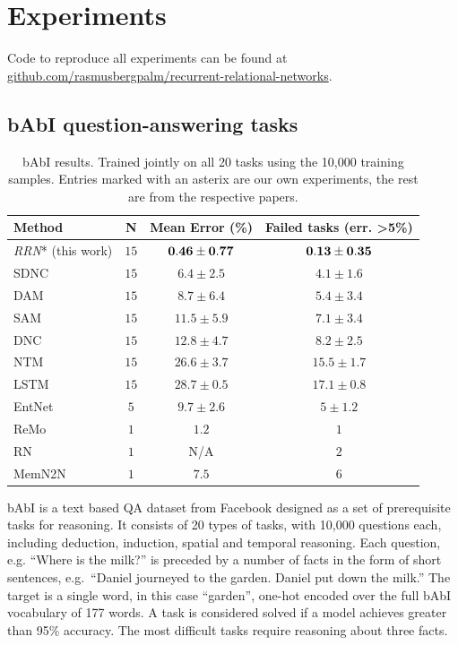 \documentclass{article}
\begin{document}
\section{Experiments}
Code to reproduce all experiments can be found at 
\href{https://github.com/rasmusbergpalm/recurrent-relational-networks}{github.com/rasmusbergpalm/recurrent-relational-networks}.
\subsection{bAbI question-answering tasks}
\begin{table}[!ht]
\caption{bAbI results. Trained jointly on all 20 tasks using the 10,000 training samples. Entries marked with an asterix are our own experiments, the rest are from the respective papers.}
\label{table:babi-results}
\centering
  \begin{tabular}{lccc}
  \toprule
  Method & N & Mean Error (\%) & Failed tasks (err. \textgreater 5\%) \\  
  \midrule
  \textit{RRN}* (this work) & $15$ & $\bf{0.46 \pm 0.77}$ & $\bf{0.13 \pm 0.35}$ \\
  SDNC \citep{rae2016scaling} & $15$ &  $6.4 \pm 2.5$ & $4.1 \pm 1.6$\\
  DAM \citep{rae2016scaling} & $15$ &  $8.7 \pm 6.4$ & $5.4 \pm 3.4$ \\
  SAM \citep{rae2016scaling} & $15$ &  $11.5 \pm 5.9$ & $7.1 \pm 3.4$\\  
  DNC \citep{rae2016scaling} & $15$ &  $12.8 \pm 4.7$ & $8.2 \pm 2.5$ \\
  NTM \citep{rae2016scaling} & $15$ &  $26.6 \pm 3.7$& $15.5 \pm 1.7$ \\
  LSTM \citep{rae2016scaling} & $15$ & $28.7 \pm 0.5$ & $17.1 \pm 0.8$ \\
  EntNet \citep{henaff2016tracking} & $5$ & $9.7 \pm 2.6$ & $5 \pm 1.2$ \\ 
  ReMo \citep{yang2018finding} & $1$ & $1.2$ & $1$ \\  
  RN \citep{santoro2017simple} & $1$ & N/A & $2$ \\
  MemN2N \citep{sukhbaatar2015end} & $1$ & $7.5$ & $6$ \\
  \bottomrule
  \end{tabular}  
\end{table}

bAbI is a text based QA dataset from Facebook \citep{weston2015towards} designed as a set of prerequisite tasks for reasoning. It consists of 20 types of tasks, with 10,000 questions each, including deduction, induction, spatial and temporal reasoning. Each question, e.g. ``Where is the milk?'' is preceded by a number of facts in the form of short sentences, e.g.~``Daniel journeyed to the garden. Daniel put down the milk.'' The target is a single word, in this case ``garden'', one-hot encoded over the full bAbI vocabulary of 177 words. A task is considered solved if a model achieves greater than 95\% accuracy. The most difficult tasks require reasoning about three facts.
\end{document}
